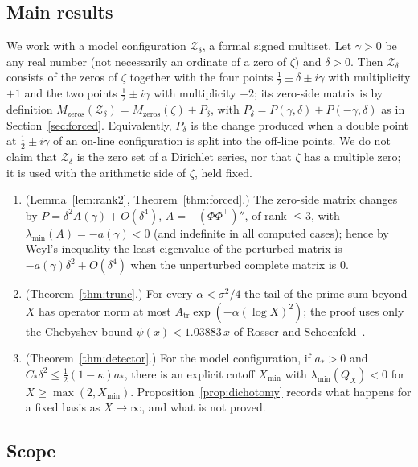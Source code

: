 \documentclass[11pt]{amsart}
\theoremstyle{definition}
\theoremstyle{remark}
\newcommand{\lmin}{\lambda_{\min}}
\newcommand{\Atr}{A_{\mathrm{tr}}}
\begin{document}
\subsection{Main results}

We work with a model configuration $\mathcal Z_\delta$, a formal signed
multiset. Let $\gamma>0$ be any real number (not necessarily an ordinate of
a zero of $\zeta$) and $\delta>0$. Then $\mathcal Z_\delta$ consists of the
zeros of $\zeta$ together with the four points $\tfrac12\pm\delta\pm i\gamma$
with multiplicity $+1$ and the two points $\tfrac12\pm i\gamma$ with
multiplicity $-2$; its zero-side matrix is by definition
$M_{\mathrm{zeros}}(\mathcal Z_\delta)=M_{\mathrm{zeros}}(\zeta)+P_\delta$,
with $P_\delta=P(\gamma,\delta)+P(-\gamma,\delta)$ as in
Section~\ref{sec:forced}. Equivalently, $P_\delta$ is the change produced
when a double point at $\tfrac12\pm i\gamma$ of an on-line configuration is
split into the off-line points. We do not claim that $\mathcal Z_\delta$ is
the zero set of a Dirichlet series, nor that $\zeta$ has a multiple zero; it
is used with the arithmetic side of $\zeta$, held fixed.

\begin{enumerate}[label=\textbf{(\Roman*)}]
\item (Lemma~\ref{lem:rank2}, Theorem~\ref{thm:forced}.) The zero-side matrix
changes by $P=\delta^2A(\gamma)+O(\delta^4)$, $A=-(\Phi\Phi^{\top})''$, of
rank $\le3$, with $\lmin(A)=-a(\gamma)<0$ (and indefinite in all computed cases); hence by Weyl's
inequality the least eigenvalue of the perturbed matrix is $-a(\gamma)\delta^2+O(\delta^4)$
when the unperturbed complete matrix is $0$.
\item (Theorem~\ref{thm:trunc}.) For every $\alpha<\sigma^2/4$ the tail of
the prime sum beyond $X$ has operator norm at most $\Atr\exp(-\alpha(\log X)^2)$; the proof uses only the Chebyshev bound
$\psi(x)<1.03883\,x$ of Rosser and Schoenfeld~\cite{RS62}.
\item (Theorem~\ref{thm:detector}.) For the model configuration, if $a_*>0$
and $C_*\delta^2\le\tfrac12(1-\kappa)a_*$, there is an explicit cutoff
$X_{\min}$ with $\lmin(Q_X)<0$ for $X\ge\max(2,X_{\min})$.
Proposition~\ref{prop:dichotomy} records what happens for a fixed basis as
$X\to\infty$, and what is not proved.
\end{enumerate}

\subsection{Scope}
\end{document}
